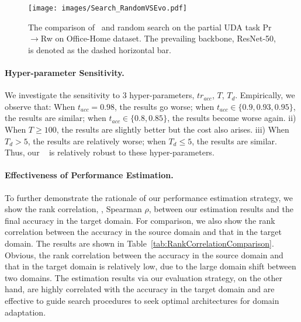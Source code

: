 \documentclass[10pt,twocolumn,letterpaper]{article}
\begin{document}
\begin{figure}
    \centering
    \texttt{[image: images/Search\_RandomVSEvo.pdf]}
    \caption{The comparison of \iMethod\, and random search on the partial UDA task Pr$\to$Rw on Office-Home dataset. The prevailing backbone, ResNet-50, is denoted as the dashed horizontal bar.
    }
    \label{fig:VisSearchProcess}
    \vspace{-2mm}
\end{figure} 
\vspace{-2mm}
\paragraph{Hyper-parameter Sensitivity.}
We investigate the sensitivity to $3$ hyper-parameters, $tr_{acc}$, $T$, $T_{d}$. Empirically, we observe that: When $t_{acc} = 0.98$, the results go worse; when $t_{acc} \in \{0.9, 0.93, 0.95\}$, the results are similar; when $t_{acc} \in \{0.8, 0.85\}$, the results become worse again. ii) When $T \ge 100$, the results are slightly better but the cost also arises. iii) When $T_d > 5$, the results are relatively worse; when $T_d \le 5$, the results are similar.
Thus, our \iMethod~ is relatively robust to these hyper-parameters.





\vspace{-2mm}
\paragraph{Effectiveness of Performance Estimation.}
To further demonstrate the rationale of our performance estimation strategy, we show the rank correlation, \ie, Spearman $\rho$, between our estimation results and the final accuracy in the target domain. For comparison, we also show the rank correlation between the accuracy in the source domain and that in the target domain. The results are shown in Table~\ref{tab:RankCorrelationComparison}.
Obvious, the rank correlation between the accuracy in the source domain and that in the target domain is relatively low, due to the large domain shift between two domains. The estimation results via our evaluation strategy, on the other hand, are highly correlated with the accuracy in the target domain and are effective to guide search procedures to seek optimal architectures for domain adaptation.
\end{document}
